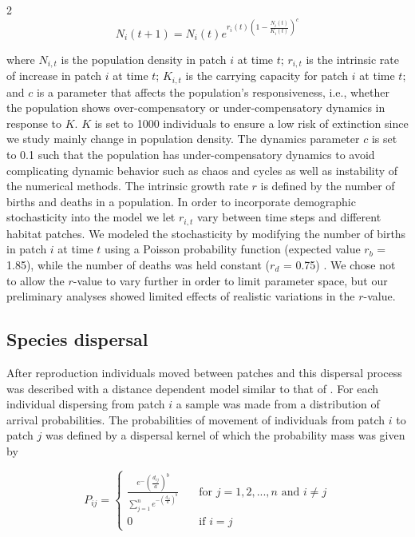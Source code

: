 \documentclass[12pt,pdftex]{article}
\begin{document}
\begin{spacing}{2}
\begin{equation}
N_{i}(t+1)= N_{i}(t)    e^{r_{i}(t)(1-\frac{N_{i}(t)}{K_{i}(t)})^c}	
\end{equation}	

where $N_{i,t}$ is the population density in patch $i$ at time $t$; $r_{i,t}$ is the intrinsic rate of increase in patch $i$ at time $t$; $K_{i,t}$ is the carrying capacity for patch $i$ at time $t$; and $c$ is a parameter that affects the population's responsiveness, i.e., whether the population shows over-compensatory or under-compensatory dynamics in response to $K$.  $K$  is set to 1000 individuals to ensure a low risk of extinction since we study mainly change in population density. The dynamics parameter $c$ is set to 0.1 such that the population has under-compensatory dynamics to avoid complicating dynamic behavior such as chaos and cycles as well as instability of the numerical methods. The intrinsic growth rate $r$ is defined by the number of births and deaths in a population. In order to incorporate demographic stochasticity into the model we let $r_{i,t}$ vary between time steps and different habitat patches. We modeled the stochasticity by modifying the number of births in patch $i$ at time $t$ using a Poisson probability function (expected value $r_{b}$ = 1.85),  while the number of deaths was held constant  ($r_{d}$ = 0.75) \citep{Melbourne2008}. We chose not to allow the $r$-value to vary further in order to limit parameter space, but our preliminary analyses showed limited effects of realistic variations in the $r$-value. 

\subsection*{Species dispersal}
After reproduction individuals moved between patches and this dispersal process was described with a distance dependent model similar to that of \cite{Lindstrom2009}. For each individual dispersing from patch $i$ a sample was made from a distribution of arrival probabilities. The probabilities of movement of individuals from patch $i$ to patch $j$ was defined by a dispersal kernel of which the probability mass was given by

\begin{equation}
	P_{ij}=  
	\begin{cases} 
		\frac{e^-(\frac{d_{ij}}{a})^b}{\sum_{j=1}^{n}e^{-(\frac{d_{ij}}{a})^b}}   
				& \quad \text{for } j = 1,2,...,n \text{ and } i\neq j  \\    
		0 & \quad \text{if } i=j
	\end{cases}
\end{equation}



\end{spacing}
\end{document}
